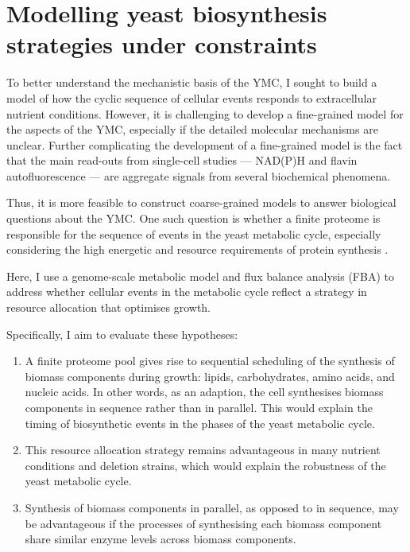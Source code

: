 \chapter{Modelling yeast biosynthesis strategies under constraints}
\label{ch:model}

To better understand the mechanistic basis of the YMC, I sought to build a model of how the cyclic sequence of cellular events responds to extracellular nutrient conditions.
However, it is challenging to develop a fine-grained model for the aspects of the YMC,
especially if the detailed molecular mechanisms are unclear.
Further complicating the development of a fine-grained model is the fact that the main read-outs from single-cell studies --- NAD(P)H and flavin autofluorescence --- are aggregate signals from several biochemical phenomena.

Thus, it is more feasible to construct coarse-grained models to answer biological questions about the YMC\@.
One such question is whether a finite proteome is responsible for the sequence of events in the yeast metabolic cycle, especially considering the high energetic and resource requirements of protein synthesis \parencite{oneillEukaryoticCellBiology2020,zylstraMetabolicDynamicsCell2022}.

Here, I use a genome-scale metabolic model and flux balance analysis (FBA) to address whether cellular events in the metabolic cycle reflect a strategy in resource allocation that optimises growth.

\pagebreak

Specifically, I aim to evaluate these hypotheses:
\begin{enumerate}
  \item A finite proteome pool gives rise to sequential scheduling of the synthesis of biomass components during growth: lipids, carbohydrates, amino acids, and nucleic acids.
        In other words, as an adaption, the cell synthesises biomass components in sequence rather than in parallel.
        This would explain the timing of biosynthetic events in the phases of the yeast metabolic cycle.
  \item This resource allocation strategy remains advantageous in many nutrient conditions and deletion strains,
        which would explain the robustness of the yeast metabolic cycle.
  \item Synthesis of biomass components in parallel, as opposed to in sequence, may be advantageous if the processes of synthesising each biomass component share similar enzyme levels across biomass components.
\end{enumerate}

